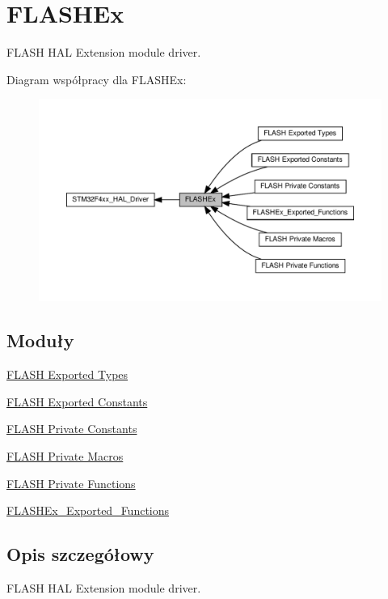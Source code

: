 \hypertarget{group___f_l_a_s_h_ex}{}\section{F\+L\+A\+S\+H\+Ex}
\label{group___f_l_a_s_h_ex}


F\+L\+A\+SH H\+AL Extension module driver.  


Diagram współpracy dla F\+L\+A\+S\+H\+Ex\+:\nopagebreak
\begin{figure}[H]
\begin{center}
\leavevmode
\includegraphics[width=350pt]{group___f_l_a_s_h_ex}
\end{center}
\end{figure}
\subsection*{Moduły}
\begin{DoxyCompactItemize}
\item 
\hyperlink{group___f_l_a_s_h_ex___exported___types}{F\+L\+A\+S\+H Exported Types}
\item 
\hyperlink{group___f_l_a_s_h_ex___exported___constants}{F\+L\+A\+S\+H Exported Constants}
\item 
\hyperlink{group___f_l_a_s_h_ex___private___constants}{F\+L\+A\+S\+H Private Constants}
\item 
\hyperlink{group___f_l_a_s_h_ex___private___macros}{F\+L\+A\+S\+H Private Macros}
\item 
\hyperlink{group___f_l_a_s_h_ex___private___functions}{F\+L\+A\+S\+H Private Functions}
\item 
\hyperlink{group___f_l_a_s_h_ex___exported___functions}{F\+L\+A\+S\+H\+Ex\+\_\+\+Exported\+\_\+\+Functions}
\end{DoxyCompactItemize}


\subsection{Opis szczegółowy}
F\+L\+A\+SH H\+AL Extension module driver. 

